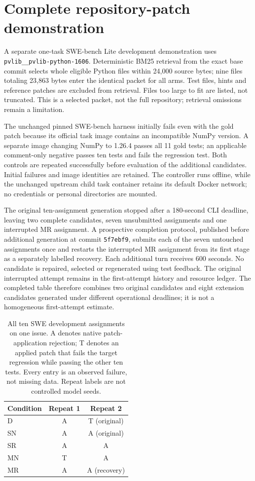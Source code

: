 \section{Complete repository-patch demonstration}
\label{sec:swe-dev1}

A separate one-task SWE-bench Lite development demonstration uses \texttt{pvlib\_\_pvlib-python-1606}. Deterministic BM25 retrieval from the exact base commit selects whole eligible Python files within 24,000 source bytes; nine files totaling 23,863 bytes enter the identical packet for all arms. Test files, hints and reference patches are excluded from retrieval. Files too large to fit are listed, not truncated. This is a selected packet, not the full repository; retrieval omissions remain a limitation.

The unchanged pinned SWE-bench harness initially fails even with the gold patch because its official task image contains an incompatible NumPy version. A separate image changing NumPy to 1.26.4 passes all 11 gold tests; an applicable comment-only negative passes ten tests and fails the regression test. Both controls are repeated successfully before evaluation of the additional candidates. Initial failures and image identities are retained. The controller runs offline, while the unchanged upstream child task container retains its default Docker network; no credentials or personal directories are mounted.

The original ten-assignment generation stopped after a 180-second CLI deadline, leaving two complete candidates, seven unsubmitted assignments and one interrupted MR assignment. A prospective completion protocol, published before additional generation at commit \texttt{5f7ebf9}, submits each of the seven untouched assignments once and restarts the interrupted MR assignment from its first stage as a separately labelled recovery. Each additional turn receives 600 seconds. No candidate is repaired, selected or regenerated using test feedback. The original interrupted attempt remains in the first-attempt history and resource ledger. The completed table therefore combines two original candidates and eight extension candidates generated under different operational deadlines; it is not a homogeneous first-attempt estimate.

\begin{table}[t]
\centering
\caption{All ten SWE development assignments on one issue. A denotes native patch-application rejection; T denotes an applied patch that fails the target regression while passing the other ten tests. Every entry is an observed failure, not missing data. Repeat labels are not controlled model seeds.}
\label{tab:swe-complete}
\begin{tabular*}{\linewidth}{@{\extracolsep{\fill}}lcc}
\hline
Condition & Repeat 1 & Repeat 2 \\
\hline
D  & A & T (original) \\
SN & A & A (original) \\
SR & A & A \\
MN & T & A \\
MR & A & A (recovery) \\
\hline
\end{tabular*}
\end{table}

